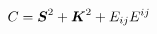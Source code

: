 \begin{equation}
C= \mbox{\boldmath$S$}^2 + \mbox{\boldmath$K$}^2 + E_{ij} E^{ij}   \label{eq:5s}
\end{equation} 
